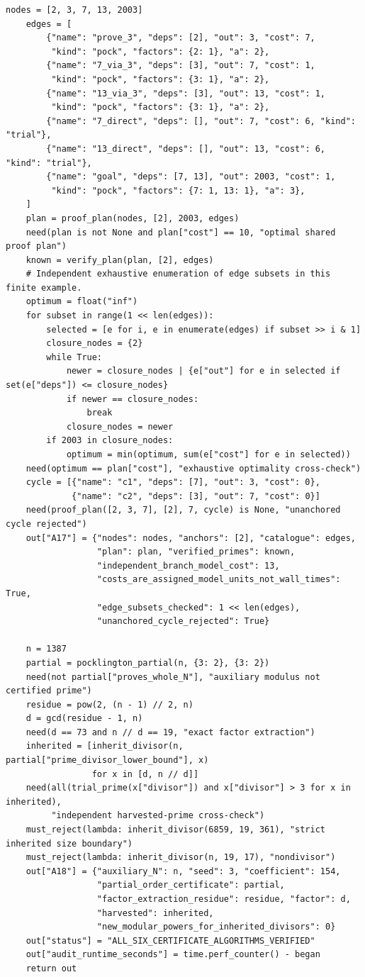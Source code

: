 \documentclass[11pt,a4paper]{article}
\theoremstyle{definition}\newtheorem{definition}[theorem]{Definition}
\theoremstyle{remark}\newtheorem{remark}[theorem]{Remark}
\begin{document}
\begin{lstlisting}[label=lst:certificates]
    nodes = [2, 3, 7, 13, 2003]
    edges = [
        {"name": "prove_3", "deps": [2], "out": 3, "cost": 7,
         "kind": "pock", "factors": {2: 1}, "a": 2},
        {"name": "7_via_3", "deps": [3], "out": 7, "cost": 1,
         "kind": "pock", "factors": {3: 1}, "a": 2},
        {"name": "13_via_3", "deps": [3], "out": 13, "cost": 1,
         "kind": "pock", "factors": {3: 1}, "a": 2},
        {"name": "7_direct", "deps": [], "out": 7, "cost": 6, "kind": "trial"},
        {"name": "13_direct", "deps": [], "out": 13, "cost": 6, "kind": "trial"},
        {"name": "goal", "deps": [7, 13], "out": 2003, "cost": 1,
         "kind": "pock", "factors": {7: 1, 13: 1}, "a": 3},
    ]
    plan = proof_plan(nodes, [2], 2003, edges)
    need(plan is not None and plan["cost"] == 10, "optimal shared proof plan")
    known = verify_plan(plan, [2], edges)
    # Independent exhaustive enumeration of edge subsets in this finite example.
    optimum = float("inf")
    for subset in range(1 << len(edges)):
        selected = [e for i, e in enumerate(edges) if subset >> i & 1]
        closure_nodes = {2}
        while True:
            newer = closure_nodes | {e["out"] for e in selected if set(e["deps"]) <= closure_nodes}
            if newer == closure_nodes:
                break
            closure_nodes = newer
        if 2003 in closure_nodes:
            optimum = min(optimum, sum(e["cost"] for e in selected))
    need(optimum == plan["cost"], "exhaustive optimality cross-check")
    cycle = [{"name": "c1", "deps": [7], "out": 3, "cost": 0},
             {"name": "c2", "deps": [3], "out": 7, "cost": 0}]
    need(proof_plan([2, 3, 7], [2], 7, cycle) is None, "unanchored cycle rejected")
    out["A17"] = {"nodes": nodes, "anchors": [2], "catalogue": edges,
                  "plan": plan, "verified_primes": known,
                  "independent_branch_model_cost": 13,
                  "costs_are_assigned_model_units_not_wall_times": True,
                  "edge_subsets_checked": 1 << len(edges),
                  "unanchored_cycle_rejected": True}

    n = 1387
    partial = pocklington_partial(n, {3: 2}, {3: 2})
    need(not partial["proves_whole_N"], "auxiliary modulus not certified prime")
    residue = pow(2, (n - 1) // 2, n)
    d = gcd(residue - 1, n)
    need(d == 73 and n // d == 19, "exact factor extraction")
    inherited = [inherit_divisor(n, partial["prime_divisor_lower_bound"], x)
                 for x in [d, n // d]]
    need(all(trial_prime(x["divisor"]) and x["divisor"] > 3 for x in inherited),
         "independent harvested-prime cross-check")
    must_reject(lambda: inherit_divisor(6859, 19, 361), "strict inherited size boundary")
    must_reject(lambda: inherit_divisor(n, 19, 17), "nondivisor")
    out["A18"] = {"auxiliary_N": n, "seed": 3, "coefficient": 154,
                  "partial_order_certificate": partial,
                  "factor_extraction_residue": residue, "factor": d,
                  "harvested": inherited,
                  "new_modular_powers_for_inherited_divisors": 0}
    out["status"] = "ALL_SIX_CERTIFICATE_ALGORITHMS_VERIFIED"
    out["audit_runtime_seconds"] = time.perf_counter() - began
    return out



\end{lstlisting}
\end{document}
